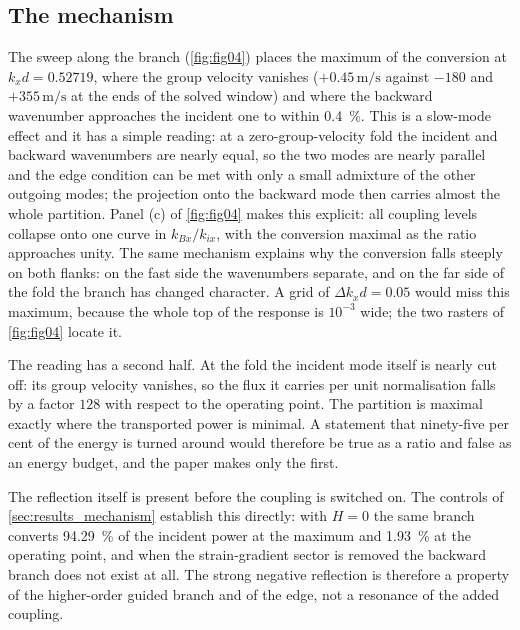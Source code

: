 \subsection{The mechanism}
\label{sec:disc_mechanism}

The sweep along the branch (\cref{fig:fig04}) places the maximum of the
conversion at $k_xd=0.52719$, where the group velocity vanishes
($+0.45\,\si{\metre\per\second}$ against $-180$ and $+355\,\si{\metre\per\second}$
at the ends of the solved window) and where the backward wavenumber approaches
the incident one to within \SI{0.4}{\percent}.  This is a slow-mode effect and
it has a simple reading: at a zero-group-velocity fold the incident and backward
wavenumbers are nearly equal, so the two modes are nearly parallel and the edge
condition can be met with only a small admixture of the other outgoing modes;
the projection onto the backward mode then carries almost the whole partition.
Panel (c) of \cref{fig:fig04} makes this explicit: all coupling levels collapse
onto one curve in $k_{Bx}/k_{ix}$, with the conversion maximal as the ratio
approaches unity.  The same mechanism explains why the conversion falls steeply
on both flanks: on the fast side the wavenumbers separate, and on the far side of
the fold the branch has changed character.  A grid of $\Delta k_xd=0.05$ would miss this maximum, because the whole top of
the response is $10^{-3}$ wide; the two rasters of \cref{fig:fig04} locate it.

The reading has a second half.  At the fold the incident
mode itself is nearly cut off: its group velocity vanishes, so the flux it
carries per unit normalisation falls by a factor $128$ with respect to the
operating point.  The partition is maximal exactly where the transported power
is minimal.  A statement that ninety-five per cent of the energy is turned around
would therefore be true as a ratio and false as an energy budget, and the paper
makes only the first.

The reflection itself is present before the coupling is switched on.  The
controls of \cref{sec:results_mechanism} establish this directly: with $H=0$ the
same branch converts \SI{94.29}{\percent} of the incident power at the
maximum and \SI{1.93}{\percent} at the operating point, and when the
strain-gradient sector is removed the backward branch does not exist at all.
The strong negative reflection is therefore a property of the higher-order
guided branch and of the edge, not a resonance of the added coupling.

